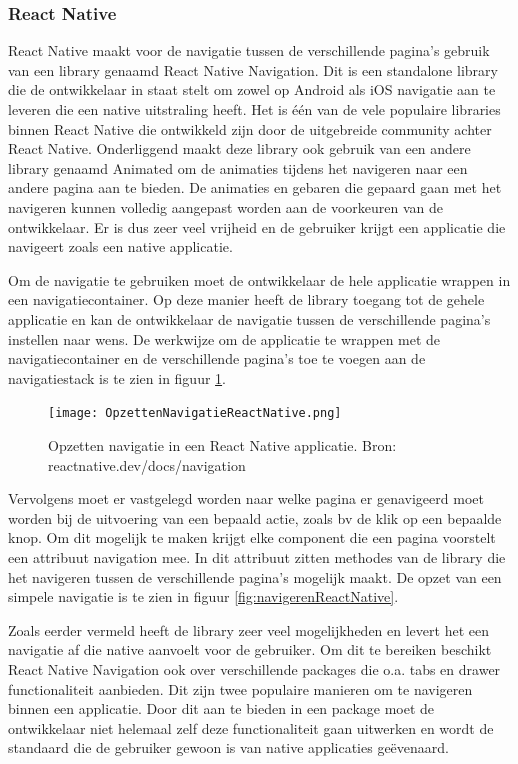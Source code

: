\subsubsection{React Native}
\label{subsubsec:navigatieReactNative}

React Native maakt voor de navigatie tussen de verschillende pagina's gebruik
van een library genaamd React Native Navigation. Dit is een standalone library
die de ontwikkelaar in staat stelt om zowel op Android als iOS navigatie aan te
leveren die een native uitstraling heeft. Het is één van de vele populaire
libraries binnen React Native die ontwikkeld zijn door de uitgebreide community
achter React Native. Onderliggend maakt deze library ook gebruik van een andere
library genaamd Animated om de animaties tijdens het navigeren naar een andere
pagina aan te bieden. De animaties en gebaren die gepaard gaan met het navigeren
kunnen volledig aangepast worden aan de voorkeuren van de ontwikkelaar. Er is
dus zeer veel vrijheid en de gebruiker krijgt een applicatie die navigeert zoals
een native applicatie. 

Om de navigatie te gebruiken moet de ontwikkelaar de hele applicatie wrappen in
een navigatiecontainer. Op deze manier heeft de library toegang tot de gehele
applicatie en kan de ontwikkelaar de navigatie tussen de verschillende pagina's
instellen naar wens. De werkwijze om de applicatie te wrappen met de
navigatiecontainer en de verschillende pagina's toe te voegen aan de
navigatiestack is te zien in figuur \ref{fig:opzettenNavigatieReactNative}.

\begin{figure}
    \texttt{[image: OpzettenNavigatieReactNative.png]}
    \caption{Opzetten navigatie in een React Native applicatie. Bron:
        reactnative.dev/docs/navigation}
    \label{fig:opzettenNavigatieReactNative}
\end{figure}

Vervolgens moet er vastgelegd worden naar welke pagina er genavigeerd moet
worden bij de uitvoering van een bepaald actie, zoals bv de klik op een bepaalde
knop. Om dit mogelijk te maken krijgt elke component die een pagina voorstelt
een attribuut navigation mee. In dit attribuut zitten methodes van de library
die het navigeren tussen de verschillende pagina's mogelijk maakt. De opzet van
een simpele navigatie is te zien in figuur \ref{fig:navigerenReactNative}. 

Zoals eerder vermeld heeft de library zeer veel mogelijkheden en levert het een
navigatie af die native aanvoelt voor de gebruiker. Om dit te bereiken beschikt
React Native Navigation ook over verschillende packages die o.a. tabs en drawer
functionaliteit aanbieden. Dit zijn twee populaire manieren om te navigeren
binnen een applicatie. Door dit aan te bieden in een package moet de
ontwikkelaar niet helemaal zelf deze functionaliteit gaan uitwerken en wordt de
standaard die de gebruiker gewoon is van native applicaties geëvenaard.

